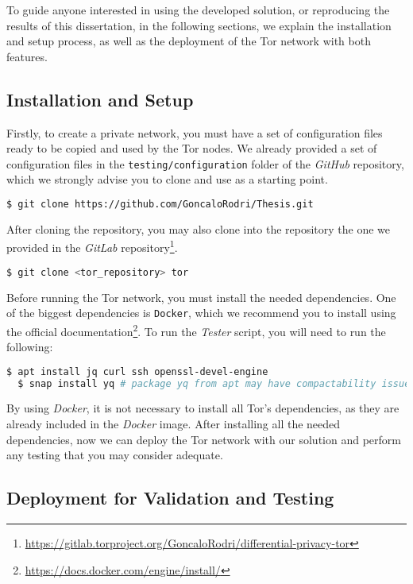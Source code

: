 To guide anyone interested in using the developed solution, or reproducing the results of this dissertation, in the following sections, we explain the installation and setup process, as well as the deployment of the Tor network with both features.


\subsection{Installation and Setup}\label{subsec:installation_and_setup}

Firstly, to create a private network, you must have a set of configuration files ready to be copied and used by the Tor nodes. We already provided a set of configuration files in the \texttt{testing/configuration} folder of the \textit{GitHub} repository, which we strongly advise you to clone and use as a starting point. 
\begin{lstlisting}[language=bash]
  $ git clone https://github.com/GoncaloRodri/Thesis.git
\end{lstlisting}

After cloning the repository, you may also clone into the repository the one we provided in the \textit{GitLab} repository\footnote{\url{https://gitlab.torproject.org/GoncaloRodri/differential-privacy-tor}}.
\begin{lstlisting}[language=bash]
  $ git clone <tor_repository> tor
\end{lstlisting}

Before running the Tor network, you must install the needed dependencies. One of the biggest dependencies is \texttt{Docker}, which we recommend you to install using the official documentation\footnote{\url{https://docs.docker.com/engine/install/}}. To run the \textit{Tester} script, you will need to run the following:
\begin{lstlisting}[language=bash]
  $ apt install jq curl ssh openssl-devel-engine
  $ snap install yq # package yq from apt may have compactability issues
\end{lstlisting}

By using \textit{Docker}, it is not necessary to install all Tor's dependencies, as they are already included in the \textit{Docker} image. After installing all the needed dependencies, now we can deploy the Tor network with our solution and perform any testing that you may consider adequate.

\subsection{Deployment for Validation and Testing}\label{subsec:deployment_for_validation_and_testing}

